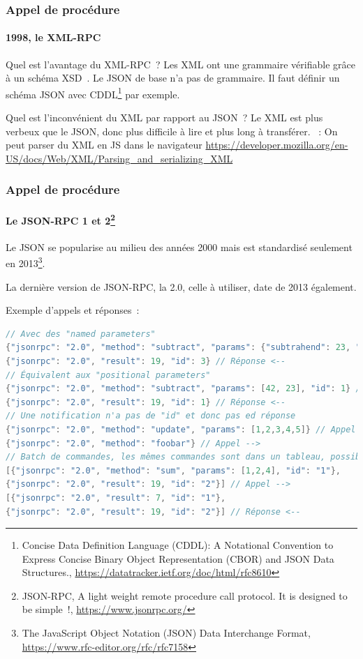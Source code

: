 \documentclass{beamer}
\begin{document}
    \begin{frame}
        \transdissolve
        \frametitle{Appel de procédure}
        \framesubtitle{1998, le XML-RPC}
        Quel est l'avantage du XML-RPC~?
        \pause
        \bigbreak
        Les XML ont une grammaire vérifiable grâce à un schéma XSD~.
        Le JSON de base n'a pas de grammaire.
        Il faut définir un schéma JSON avec CDDL\footnote{Concise Data Definition Language (CDDL): A Notational Convention to Express Concise Binary Object Representation (CBOR) and JSON Data Structures., \url{https://datatracker.ietf.org/doc/html/rfc8610}} par exemple.

        Quel est l'inconvénient du XML par rapport au JSON~?
        \pause
        \bigbreak
        Le XML est plus verbeux que le JSON, donc plus difficile à lire et plus long à transférer.
        \bigbreak
        ~: On peut parser du XML en JS dans le navigateur \url{https://developer.mozilla.org/en-US/docs/Web/XML/Parsing_and_serializing_XML}
    \end{frame}

    \begin{frame}[fragile]
        \transdissolve
        \frametitle{Appel de procédure}
        \framesubtitle{Le JSON-RPC 1 et 2\footnote{JSON-RPC, A light weight remote procedure call protocol. It is designed to be simple~!, \url{https://www.jsonrpc.org/}}}
        Le JSON se popularise au milieu des années 2000 mais est standardisé seulement en 2013\footnote{The JavaScript Object Notation (JSON) Data Interchange Format, \url{https://www.rfc-editor.org/rfc/rfc7158}}.

        La dernière version de JSON-RPC, la 2.0, celle à utiliser, date de 2013 également.

        Exemple d'appels et réponses~:
        \begin{lstlisting}[language=java,basicstyle=\ttfamily\tiny]
// Avec des "named parameters"
{"jsonrpc": "2.0", "method": "subtract", "params": {"subtrahend": 23, "minuend": 42}, "id": 3} // Appel -->
{"jsonrpc": "2.0", "result": 19, "id": 3} // Réponse <--
// Équivalent aux "positional parameters"
{"jsonrpc": "2.0", "method": "subtract", "params": [42, 23], "id": 1} // Appel -->
{"jsonrpc": "2.0", "result": 19, "id": 1} // Réponse <--
// Une notification n'a pas de "id" et donc pas ed réponse
{"jsonrpc": "2.0", "method": "update", "params": [1,2,3,4,5]} // Appel -->
{"jsonrpc": "2.0", "method": "foobar"} // Appel -->
// Batch de commandes, les mêmes commandes sont dans un tableau, possible pour les notifications également
[{"jsonrpc": "2.0", "method": "sum", "params": [1,2,4], "id": "1"},
{"jsonrpc": "2.0", "result": 19, "id": "2"}] // Appel -->
[{"jsonrpc": "2.0", "result": 7, "id": "1"},
{"jsonrpc": "2.0", "result": 19, "id": "2"}] // Réponse <--
        \end{lstlisting}
    \end{frame}
\end{document}
